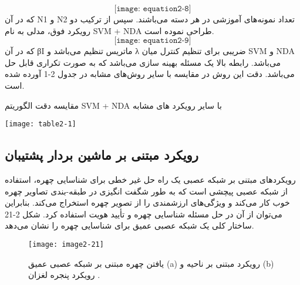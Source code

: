 \begin{equation}\label{eq2-8}
\texttt{[image: equation2-8]}
\end{equation}
که در آن N1 و N2 تعداد نمونه‌های آموزشی در هر دسته می‌باشند. سپس از ترکیب دو رویکرد فوق، مدلی به نام SVM + NDA طراحی نموده است. 
\begin{equation}\label{eq2-9}
\texttt{[image: equation2-9]}
\end{equation}	 	
که در آن βI ماتریس تنظیم می‌باشد و λ ضریبی برای تنظیم کنترل میان SVM و NDA می‌باشد. رابطه بالا یک مسئله بهینه سازی می‌باشد که به صورت تکراری قابل حل ‌می‌باشد. دقت این روش در مقایسه با سایر روش‌های مشابه در جدول 2-1 آورده شده است.
 \begin{table}
  \caption{ مقایسه دقت الگوریتم SVM + NDA با سایر رویکرد های مشابه}
  \label{tbl:2-1}
  \texttt{[image: table2-1]}
\end{table}
 
  \subsection{رویکرد مبتنی بر ماشین بردار پشتیبان}
	رویکرد‌های مبتنی بر شبکه‌ عصبی
یک راه حل غیر خطی برای شناسایی چهره، استفاده از شبکه‌ عصبی پیچشی است که به طور شگفت انگیزی در طبقه-بندی تصاویر چهره خوب کار می‌کند و ویژگی‌های ارزشمندی را از تصویر چهره استخراج می‌کند. بنابراین می‌توان از آن در حل مسئله شناسایی چهره‌ و تأیید هویت استفاده کرد. شکل 2-21 ساختار کلی یک شبکه عصبی عمیق برای شناسایی چهره را نشان می‌دهد. 
 
 \begin{figure}[h]
\centering
  \texttt{[image: image2-21]}
  \caption{یافتن چهره مبتنی بر شبکه عصبی عمیق (a) رویکرد مبتنی بر ناحیه و (b) رویکرد پنجره لغزان \cite{ref1}.}
  \label{image2-21}
\end{figure}

